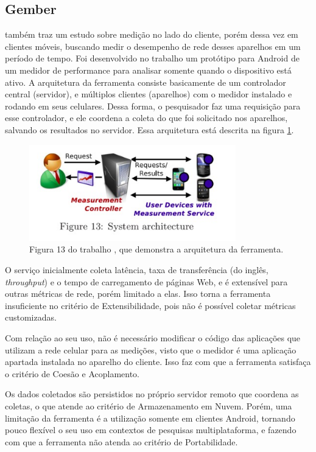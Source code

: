 \documentclass[12pt]{tcc}
\begin{document}
	\subsection{Gember}
	\par \citet{Gember2012Obtaining} também traz um estudo sobre medição no lado do cliente, porém dessa vez em clientes móveis, buscando medir o desempenho de rede desses aparelhos em um período de tempo. Foi desenvolvido no trabalho um protótipo para Android de um medidor de performance para analisar somente quando o dispositivo está ativo. A arquitetura da ferramenta consiste basicamente de um controlador central (servidor), e múltiplos clientes (aparelhos) com o medidor instalado e rodando em seus celulares. Dessa forma, o pesquisador faz uma requisição para esse controlador, e ele coordena a coleta do que foi solicitado nos aparelhos, salvando os resultados no servidor. Essa arquitetura está descrita na figura \ref{fig:gember}.

	\begin{figure}[!ht]
		\centering
		\includegraphics[width=0.8\textwidth]{figures/gember.jpeg}
		\caption{Figura 13 do trabalho \citep{Gember2012Obtaining}, que demonstra a arquitetura da ferramenta. }
		\label{fig:gember}
	\end{figure}

	O serviço inicialmente coleta latência, taxa de transferência (do inglês, \emph{throughput}) e o tempo de carregamento de páginas Web, e é extensível para outras métricas de rede, porém limitado a elas. Isso torna a ferramenta insuficiente no critério de Extensibilidade, pois não é possível coletar métricas customizadas. 

	Com relação ao seu uso, não é necessário modificar o código das aplicações que utilizam a rede celular para as medições, visto que o medidor é uma aplicação apartada instalada no aparelho do cliente. Isso faz com que a ferramenta satisfaça o critério de Coesão e Acoplamento. 

	Os dados coletados são persistidos no próprio servidor remoto que coordena as coletas, o que atende ao critério de Armazenamento em Nuvem. Porém, uma limitação da ferramenta é a utilização somente em clientes Android, tornando pouco flexível o seu uso em contextos de pesquisas multiplataforma, e fazendo com que a ferramenta não atenda ao critério de Portabilidade.
\end{document}
